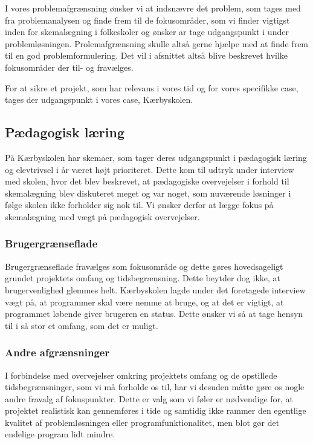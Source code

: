 
I vores problemafgrænsning ønsker vi at indsnævre det problem, som tages med fra problemanalysen og finde frem til de fokusområder, som vi finder vigtigst inden for skemalægning i folkeskoler og ønsker ar tage udgangspunkt i under problemløsningen. Prolemafgrænsning skulle altså gerne hjælpe med at finde frem til en god problemformulering. Det vil i afsnittet altså blive beskrevet hvilke fokusområder der til- og fravælges.

For at sikre et projekt, som har relevans i vores tid og for vores specifikke case, tages der udgangspunkt i vores case, Kærbyskolen.

\subsection*{Pædagogisk læring}
På Kærbyskolen har skemaer, som tager deres udgangspunkt i pædagogisk læring og elevtrivsel i år været højt prioriteret. Dette kom til udtryk under interview med skolen, hvor det blev beskrevet, at pædagogiske overvejelser i forhold til skemalægning blev diskuteret meget og var noget, som nuværende løsninger i følge skolen ikke forholder sig nok til. Vi ønsker derfor at lægge fokus på skemalægning med vægt på pædagogisk overvejelser.

\subsubsection*{Brugergrænseflade}
Brugergrænseflade fravælges som fokusområde og dette gøres hovedsageligt grundet projektets omfang og tidsbegrænsning. Dette beytder dog ikke, at brugervenlighed glemmes helt. Kærbyskolen lagde under det foretagede interview vægt på, at programmer skal være nemme at bruge, og at det er vigtigt, at programmet løbende giver brugeren en status. Dette ønsker vi så at tage hensyn til i så stor et omfang, som det er muligt.

\subsubsection*{Andre afgrænsninger}
I forbindelse med overvejelser omkring projektets omfang og de opstillede tidsbegrænsninger, som vi må forholde os til, har vi desuden måtte gøre os nogle andre fravalg af fokuspunkter. Dette er valg som vi føler er nødvendige for, at projektet realistisk kan gennemføres i tide og samtidig ikke rammer den egentlige kvalitet af problemløsningen eller programfunktionalitet, men blot gør det endelige program lidt mindre.

